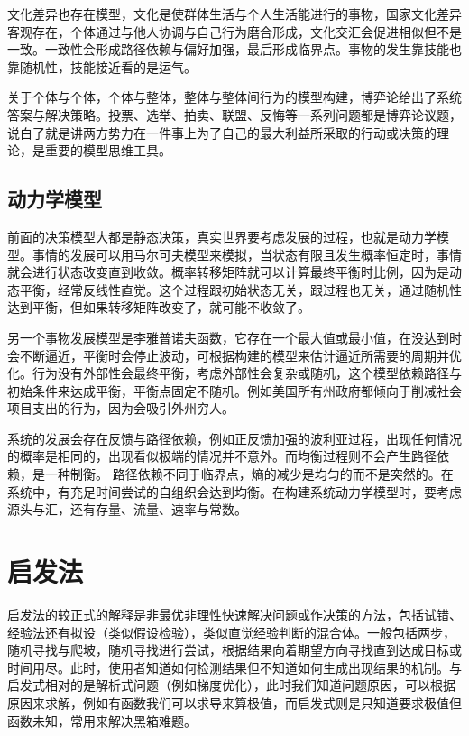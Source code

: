 \documentclass[]{tufte-book}
\begin{document}
文化差异也存在模型，文化是使群体生活与个人生活能进行的事物，国家文化差异客观存在，个体通过与他人协调与自己行为磨合形成，文化交汇会促进相似但不是一致。一致性会形成路径依赖与偏好加强，最后形成临界点。事物的发生靠技能也靠随机性，技能接近看的是运气。

关于个体与个体，个体与整体，整体与整体间行为的模型构建，博弈论给出了系统答案与解决策略。投票、选举、拍卖、联盟、反悔等一系列问题都是博弈论议题，说白了就是讲两方势力在一件事上为了自己的最大利益所采取的行动或决策的理论，是重要的模型思维工具。

\hypertarget{ux52a8ux529bux5b66ux6a21ux578b}{%
\subsection{动力学模型}\label{ux52a8ux529bux5b66ux6a21ux578b}}

前面的决策模型大都是静态决策，真实世界要考虑发展的过程，也就是动力学模型。事情的发展可以用马尔可夫模型来模拟，当状态有限且发生概率恒定时，事情就会进行状态改变直到收敛。概率转移矩阵就可以计算最终平衡时比例，因为是动态平衡，经常反线性直觉。这个过程跟初始状态无关，跟过程也无关，通过随机性达到平衡，但如果转移矩阵改变了，就可能不收敛了。

另一个事物发展模型是李雅普诺夫函数，它存在一个最大值或最小值，在没达到时会不断逼近，平衡时会停止波动，可根据构建的模型来估计逼近所需要的周期并优化。行为没有外部性会最终平衡，考虑外部性会复杂或随机，这个模型依赖路径与初始条件来达成平衡，平衡点固定不随机。例如美国所有州政府都倾向于削减社会项目支出的行为，因为会吸引外州穷人。

系统的发展会存在反馈与路径依赖，例如正反馈加强的波利亚过程，出现任何情况的概率是相同的，出现看似极端的情况并不意外。而均衡过程则不会产生路径依赖，是一种制衡。 路径依赖不同于临界点，熵的减少是均匀的而不是突然的。在系统中，有充足时间尝试的自组织会达到均衡。在构建系统动力学模型时，要考虑源头与汇，还有存量、流量、速率与常数。

\hypertarget{ux542fux53d1ux6cd5}{%
\section{启发法}\label{ux542fux53d1ux6cd5}}

启发法的较正式的解释是非最优非理性快速解决问题或作决策的方法，包括试错、经验法还有拟设（类似假设检验），类似直觉经验判断的混合体。一般包括两步，随机寻找与爬坡，随机寻找进行尝试，根据结果向着期望方向寻找直到达成目标或时间用尽。此时，使用者知道如何检测结果但不知道如何生成出现结果的机制。与启发式相对的是解析式问题（例如梯度优化），此时我们知道问题原因，可以根据原因来求解，例如有函数我们可以求导来算极值，而启发式则是只知道要求极值但函数未知，常用来解决黑箱难题。
\end{document}
